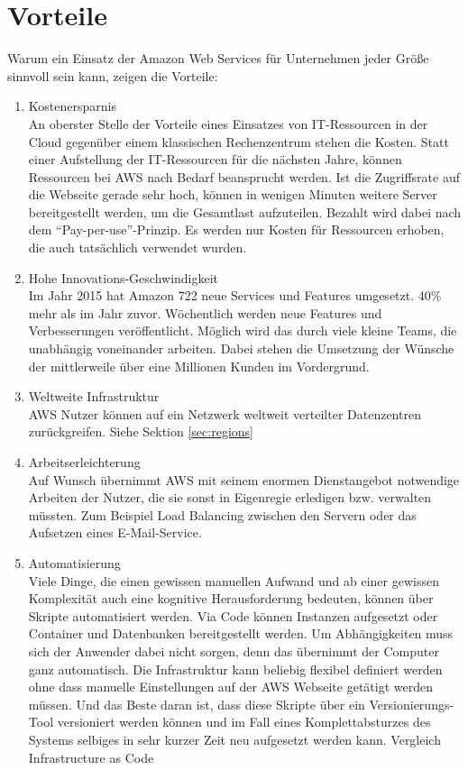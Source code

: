\section{Vorteile}
\label{sec:vorteile}
Warum ein Einsatz der Amazon Web Services für Unternehmen jeder Größe sinnvoll sein kann, zeigen die Vorteile:
\begin{enumerate}
  \item Kostenersparnis
  \\ An oberster Stelle der Vorteile eines Einsatzes von IT-Ressourcen in der Cloud gegenüber einem klassischen Rechenzentrum stehen die Kosten. Statt einer Aufstellung der IT-Ressourcen für die nächsten Jahre, können Ressourcen bei AWS nach Bedarf beansprucht werden. Ist die Zugriffsrate auf die Webseite gerade sehr hoch, können in wenigen Minuten weitere Server bereitgestellt werden, um die Gesamtlast aufzuteilen. Bezahlt wird dabei nach dem "`Pay-per-use"'-Prinzip. Es werden nur Kosten für Ressourcen erhoben, die auch tatsächlich verwendet wurden.
  \item Hohe Innovations-Geschwindigkeit
  \\ Im Jahr 2015 hat Amazon 722 neue Services und Features umgesetzt. 40\% mehr als im Jahr zuvor. Wöchentlich werden neue Features und Verbesserungen veröffentlicht. Möglich wird das durch viele kleine Teams, die unabhängig voneinander arbeiten. Dabei stehen die Umsetzung der Wünsche der mittlerweile über eine Millionen Kunden im Vordergrund.
  \item Weltweite Infrastruktur
  \\ AWS Nutzer können auf ein Netzwerk weltweit verteilter Datenzentren zurückgreifen. Siehe Sektion \ref{sec:regions}
  \item Arbeitserleichterung
  \\ Auf Wunsch übernimmt AWS mit seinem enormen Dienstangebot notwendige Arbeiten der Nutzer, die sie sonst in Eigenregie erledigen bzw. verwalten müssten. Zum Beispiel Load Balancing zwischen den Servern oder das Aufsetzen eines E-Mail-Service.
  \item Automatisierung
  \\ Viele Dinge, die einen gewissen manuellen Aufwand und ab einer gewissen Komplexität auch eine kognitive Herausforderung bedeuten, können über Skripte automatisiert werden. Via Code können Instanzen aufgesetzt oder Container und Datenbanken bereitgestellt werden. Um Abhängigkeiten muss sich der Anwender dabei nicht sorgen, denn das übernimmt der Computer ganz automatisch. Die Infrastruktur kann beliebig flexibel definiert werden ohne dass manuelle Einstellungen auf der AWS Webseite getätigt werden müssen. Und das Beste daran ist, dass diese Skripte über ein Versionierungs-Tool versioniert werden können und im Fall eines Komplettabsturzes des Systems selbiges in sehr kurzer Zeit neu aufgesetzt werden kann. {\color{red}Vergleich Infrastructure as Code}

\end{enumerate}
